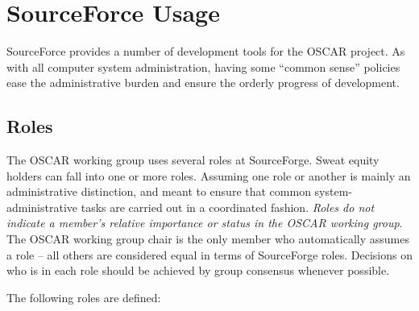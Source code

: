 %
%
%

\section{SourceForce Usage}
\label{sec:sf}

SourceForce provides a number of development tools for the OSCAR
project.  As with all computer system administration, having some
``common sense'' policies ease the administrative burden and ensure
the orderly progress of development.


\subsection{Roles}

The OSCAR working group uses several roles at SourceForge.  Sweat
equity holders can fall into one or more roles.  Assuming one role or
another is mainly an administrative distinction, and meant to ensure
that common system-administrative tasks are carried out in a
coordinated fashion.  {\em Roles do not indicate a member's relative
  importance or status in the OSCAR working group}.  The OSCAR working
group chair is the only member who automatically assumes a role -- all
others are considered equal in terms of SourceForge roles.  Decisions
on who is in each role should be achieved by group consensus whenever
possible.

The following roles are defined:

